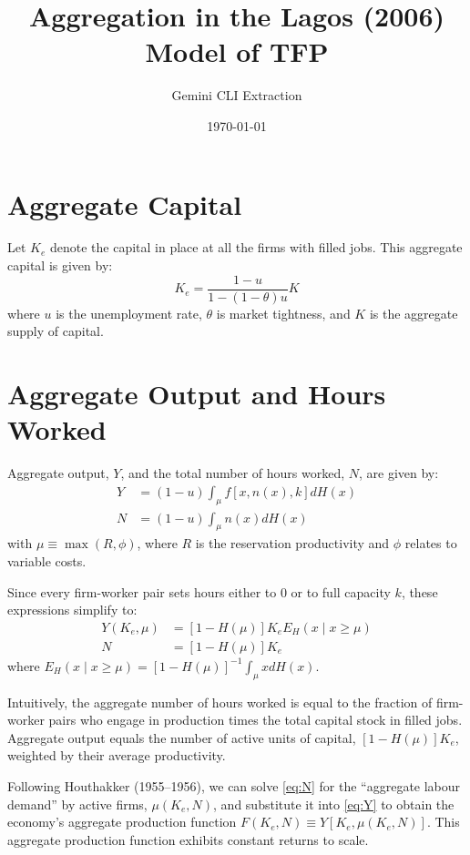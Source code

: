 \documentclass[11pt]{article}
\title{Aggregation in the Lagos (2006) Model of TFP}
\author{Gemini CLI Extraction}
\date{\today}
\begin{document}
\maketitle

\section{Aggregate Capital}
Let $K_e$ denote the capital in place at all the firms with filled jobs. This aggregate capital is given by:
\begin{equation}
K_e = \frac{1-u}{1-(1-\theta)u} K
\end{equation}
where $u$ is the unemployment rate, $\theta$ is market tightness, and $K$ is the aggregate supply of capital.

\section{Aggregate Output and Hours Worked}
Aggregate output, $Y$, and the total number of hours worked, $N$, are given by:
\begin{align}
Y &= (1 - u) \int_\mu f[x, n(x), k] dH(x) \\
N &= (1 - u) \int_\mu n(x) dH(x)
\end{align}
with $\mu \equiv \max(R, \phi)$, where $R$ is the reservation productivity and $\phi$ relates to variable costs.

Since every firm-worker pair sets hours either to 0 or to full capacity $k$, these expressions simplify to:
\begin{align}
Y(K_e, \mu) &= [1 - H(\mu)] K_e E_H(x \mid x \ge \mu) \label{eq:Y} \\
N &= [1 - H(\mu)] K_e \label{eq:N}
\end{align}
where $E_H(x \mid x \ge \mu) = [1 - H(\mu)]^{-1} \int_\mu x dH(x)$. 

Intuitively, the aggregate number of hours worked is equal to the fraction of firm-worker pairs who engage in production times the total capital stock in filled jobs. Aggregate output equals the number of active units of capital, $[1 - H(\mu)] K_e$, weighted by their average productivity.

Following Houthakker (1955--1956), we can solve \eqref{eq:N} for the ``aggregate labour demand'' by active firms, $\mu(K_e, N)$, and substitute it into \eqref{eq:Y} to obtain the economy's aggregate production function $F(K_e, N) \equiv Y[K_e, \mu(K_e, N)]$. This aggregate production function exhibits constant returns to scale.
\end{document}

